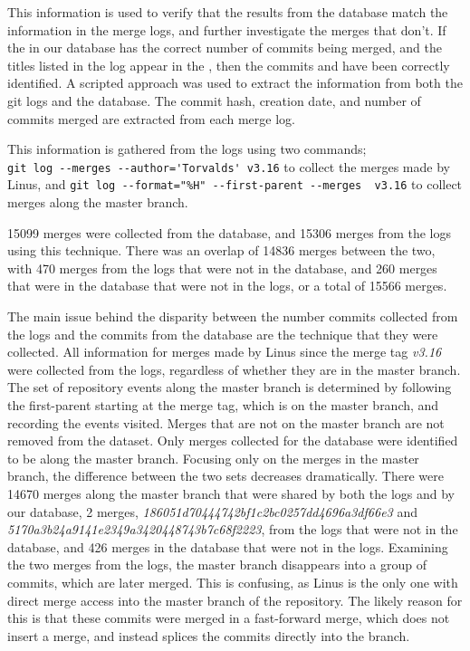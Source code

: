 This information is used to verify that the results from the database
match the information in the merge logs, and further investigate the
merges that don't. If the \mt{} in our database has the correct
number of commits being merged, and the titles listed in the log appear
in the \mt{}, then the commits and \mt{} have been correctly
identified. A scripted approach was used to extract the information from
both the git logs and  the database. The commit hash, creation date, and
number of commits merged are extracted from each merge log.

This information is gathered from the logs using two commands;\\
\verb|git log --merges --author='Torvalds' v3.16| to collect the merges
made by Linus, and \verb|git log --format="%H" --first-parent --merges  v3.16| to
collect merges along the master branch.

15099 merges were collected from the database, and 15306 merges from the
logs using this technique. There was an overlap of 14836 merges between
the two, with 470 merges from the logs that were not in the database,
and 260 merges that were in the database that were not in the logs, or a
total of 15566 merges.

The main issue behind the disparity between the number commits collected
from the logs and the commits from the database are the technique that
they were collected. All information for merges made by Linus since the
merge tag \emph{v3.16} were collected from the logs, regardless of
whether they are in the master branch. The set of repository events
along the master branch is determined by following the first-parent
starting at the merge tag, which is on the master branch, and recording
the events visited. Merges that are not on the master branch are not
removed from the dataset. Only merges collected for the database were
identified to be along the master branch. Focusing only on the merges in
the master branch, the difference between the two sets decreases
dramatically. There were 14670 merges along the master branch that were
shared by both the logs and by our database, 2 merges,
\emph{186051d70444742bf1c2bc0257dd4696a3df66e3} and
\emph{5170a3b24a9141e2349a3420448743b7c68f2223}, from the logs that were
not in the database, and 426 merges in the database that were not in the
logs. Examining the two merges from the logs, the master branch
disappears into a group of commits, which are later merged. This is
confusing, as Linus is the only one with direct merge access into the
master branch of the repository. The likely reason for this is that
these commits were merged in a fast-forward merge, which does not insert
a merge, and instead splices the commits directly into the branch.


